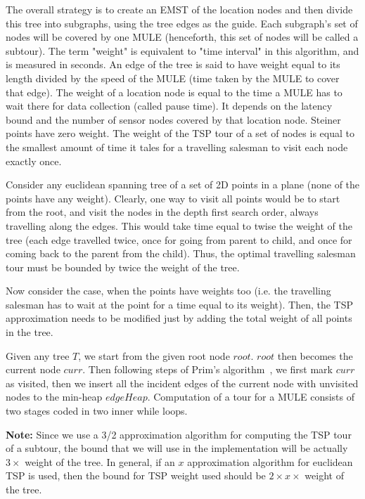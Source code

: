 The overall strategy is to create an EMST of the location nodes and then divide this tree into subgraphs, using the tree edges as the guide. Each subgraph's set of nodes will be covered by one MULE (henceforth, this set of nodes will be called a subtour). The term "weight" is equivalent to "time interval" in this algorithm, and is measured in seconds. An edge of the tree is said to have weight equal to its length divided by the speed of the MULE (time taken by the MULE to cover that edge). The weight of a location node is equal to the time a MULE has to wait there for data collection (called pause time). It depends on the latency bound and the number of sensor nodes covered by that location node. Steiner points have zero weight. The weight of the TSP tour of a set of nodes is equal to the smallest amount of time it tales for a travelling salesman to visit each node exactly once.

Consider any euclidean spanning tree of a set of 2D points in a plane (none of the points have any weight). Clearly, one way to visit all points would be to start from the root, and visit the nodes in the depth first search order, always travelling along the edges. This would take time equal to twise the weight of the tree (each edge travelled twice, once for going from parent to child, and once for coming back to the parent from the child). Thus, the optimal travelling salesman tour must be bounded by twice the weight of the tree. 

Now consider the case, when the points have weights too (i.e. the travelling salesman has to wait at the point for a time equal to its weight). Then, the TSP approximation needs to be modified just by adding the total weight of all points in the tree.

Given any tree $T$, we start from the given root node $root$. $root$ then becomes the current node $curr$. Then following steps of Prim's algorithm~\cite{Prim57}, we first mark $curr$ as visited, then we insert all the incident edges of the current node with unvisited nodes to the min-heap $edgeHeap$. Computation of a tour for a MULE consists of two stages coded in two inner while loops.



{\bf Note:} Since we use a 3/2 approximation algorithm \cite{christofides} for computing the TSP tour of a subtour, the bound that we will use in the implementation will be actually $3\times $ weight of the tree. In general, if an $x$ approximation algorithm for euclidean TSP is used, then the bound for TSP weight used should be $2\times x \times$ weight of the tree.

